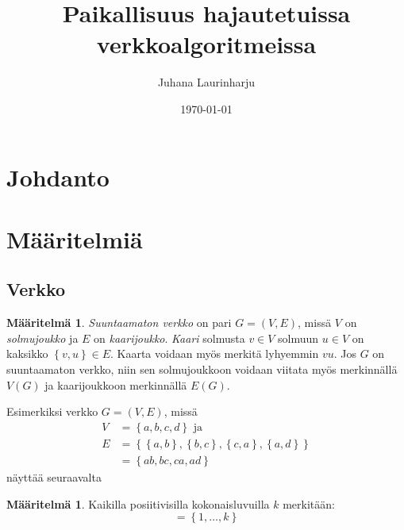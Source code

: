 \documentclass[finnish]{tktltiki2}
\title{Paikallisuus hajautetuissa verkkoalgoritmeissa}
\author{Juhana Laurinharju}
\date{\today}
\theoremstyle{definition}
\newtheorem{maar}[lau]{Määritelmä}
\theoremstyle{remark}
\newcommand{\set}[1]{\left\{ #1 \right\}}
\begin{document}

\maketitle        %

\newpage          %



\section{Johdanto}

\section{Määritelmiä}

\subsection{Verkko}

\begin{maar}
    \emph{Suuntaamaton verkko} on pari $G = (V,E)$, missä $V$ on
    \emph{solmujoukko} ja $E$ on \emph{kaarijoukko}. \emph{Kaari} solmusta $v
    \in V$ solmuun $u \in V$ on kaksikko $\set{v,u} \in E$. Kaarta voidaan myös
    merkitä lyhyemmin $vu$. Jos $G$ on suuntaamaton verkko, niin sen
    solmujoukkoon voidaan viitata myös merkinnällä $V(G)$ ja kaarijoukkoon
    merkinnällä $E(G)$.
\end{maar}

Esimerkiksi verkko $G = (V,E)$, missä
%
\begin{align*}
    V &= \set{a,b,c,d} \text{ ja}\\
    E &= \set{ \set{a,b}, \set{b,c}, \set{c,a}, \set{a,d}} \\
      &= \set{ab, bc, ca, ad}
\end{align*}
%
näyttää seuraavalta
%
\begin{center}
\end{center}

\begin{maar}
    Kaikilla posiitivisilla kokonaisluvuilla $k$ merkitään:
    \begin{equation*}
        [k] = \set{1, \dots, k}
    \end{equation*}
\end{maar}
\end{document}
